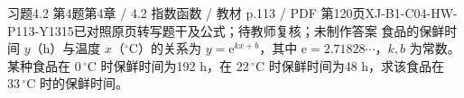 \par\noindent\begin{minipage}{\linewidth}
\begin{bankitem}{习题4.2 第4题}{第4章 / 4.2 指数函数 / 教材 p.113 / PDF 第120页}{XJ-B1-C04-HW-P113-Y1315}{已对照原页转写题干及公式；待教师复核；未制作答案}
食品的保鲜时间 $y$（h）与温度 $x$（$^\circ\mathrm C$）的关系为 $y=\mathrm e^{kx+b}$，其中 $\mathrm e=2.71828\cdots$，$k,b$ 为常数。某种食品在 $0\,{}^\circ\mathrm C$ 时保鲜时间为192 h，在 $22\,{}^\circ\mathrm C$ 时保鲜时间为48 h，求该食品在 $33\,{}^\circ\mathrm C$ 时的保鲜时间。
\end{bankitem}
\end{minipage}\par\medskip
